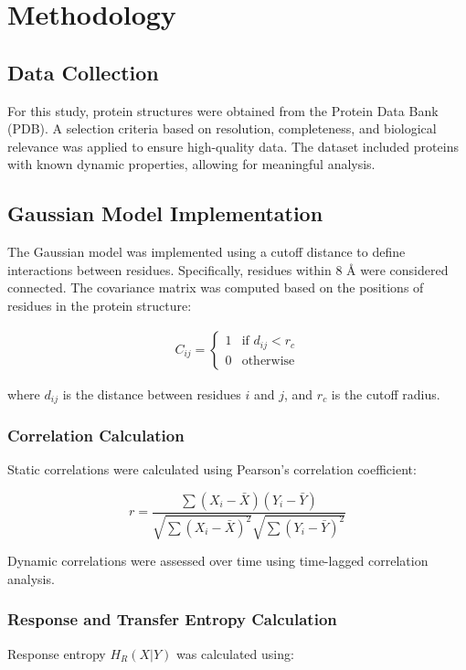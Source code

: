 \documentclass{report}  %
\begin{document}
\chapter{Methodology}

\section{Data Collection}
For this study, protein structures were obtained from the Protein Data Bank (PDB). A selection criteria based on resolution, completeness, and biological relevance was applied to ensure high-quality data. The dataset included proteins with known dynamic properties, allowing for meaningful analysis.

\section{Gaussian Model Implementation}
The Gaussian model was implemented using a cutoff distance to define interactions between residues. Specifically, residues within 8 Å were considered connected. The covariance matrix was computed based on the positions of residues in the protein structure:

\begin{align}
    C_{ij} = 
    \begin{cases} 
    1 & \text{if } d_{ij} < r_c \\
    0 & \text{otherwise} 
    \end{cases}
\end{align}
    

where \(d_{ij}\) is the distance between residues \(i\) and \(j\), and \(r_c\) is the cutoff radius.

\subsection{Correlation Calculation}
Static correlations were calculated using Pearson's correlation coefficient:

\[
r = \frac{\sum (X_i - \bar{X})(Y_i - \bar{Y})}{\sqrt{\sum (X_i - \bar{X})^2} \sqrt{\sum (Y_i - \bar{Y})^2}}
\]

Dynamic correlations were assessed over time using time-lagged correlation analysis.

\subsection{Response and Transfer Entropy Calculation}
Response entropy \(H_R(X|Y)\) was calculated using:
\end{document}
